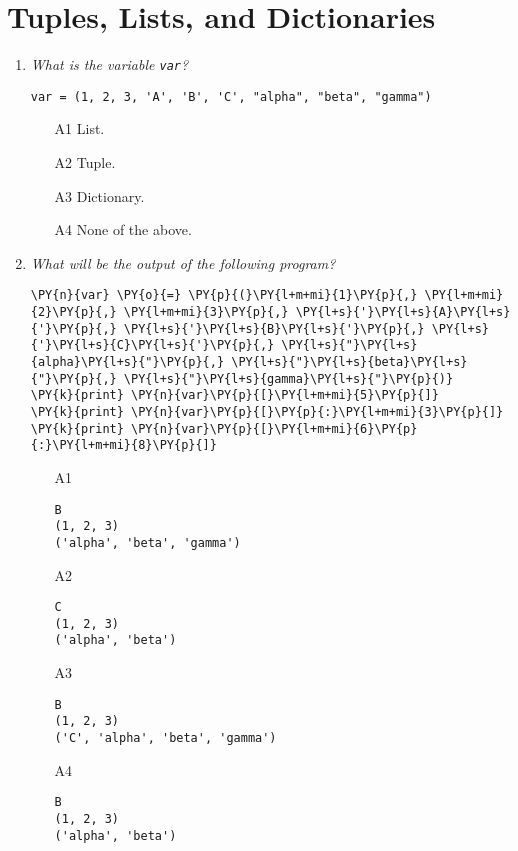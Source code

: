 
\section{Tuples, Lists, and Dictionaries}

\begin{enumerate}
\item {\em What is the variable {\tt var}?}\\[-2mm]

\begin{verbatim}
var = (1, 2, 3, 'A', 'B', 'C', "alpha", "beta", "gamma")
\end{verbatim}
\vspace{4mm}

\begin{enumerate}
\item[A1] List.
\item[A2] Tuple.
\item[A3] Dictionary.
\item[A4] None of the above.
\end{enumerate}

\vspace{6mm}

\item {\em What will be the output of the following program?}\\

\begin{Verbatim}[commandchars=\\\{\}]
\PY{n}{var} \PY{o}{=} \PY{p}{(}\PY{l+m+mi}{1}\PY{p}{,} \PY{l+m+mi}{2}\PY{p}{,} \PY{l+m+mi}{3}\PY{p}{,} \PY{l+s}{'}\PY{l+s}{A}\PY{l+s}{'}\PY{p}{,} \PY{l+s}{'}\PY{l+s}{B}\PY{l+s}{'}\PY{p}{,} \PY{l+s}{'}\PY{l+s}{C}\PY{l+s}{'}\PY{p}{,} \PY{l+s}{"}\PY{l+s}{alpha}\PY{l+s}{"}\PY{p}{,} \PY{l+s}{"}\PY{l+s}{beta}\PY{l+s}{"}\PY{p}{,} \PY{l+s}{"}\PY{l+s}{gamma}\PY{l+s}{"}\PY{p}{)}
\PY{k}{print} \PY{n}{var}\PY{p}{[}\PY{l+m+mi}{5}\PY{p}{]}
\PY{k}{print} \PY{n}{var}\PY{p}{[}\PY{p}{:}\PY{l+m+mi}{3}\PY{p}{]}
\PY{k}{print} \PY{n}{var}\PY{p}{[}\PY{l+m+mi}{6}\PY{p}{:}\PY{l+m+mi}{8}\PY{p}{]}
\end{Verbatim}
\vspace{6mm}

\begin{enumerate}
\item[A1] 
\begin{verbatim}
B
(1, 2, 3)
('alpha', 'beta', 'gamma')
\end{verbatim}
\item[A2] 
\begin{verbatim}
C
(1, 2, 3)
('alpha', 'beta')
\end{verbatim}
\item[A3] 
\begin{verbatim}
B
(1, 2, 3)
('C', 'alpha', 'beta', 'gamma')
\end{verbatim}
\item[A4]
\begin{verbatim}
B
(1, 2, 3)
('alpha', 'beta')
\end{verbatim}
\end{enumerate}


\end{enumerate}
